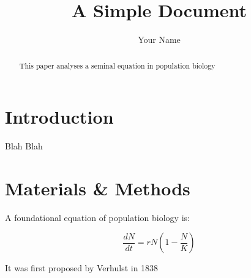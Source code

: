 \documentclass[12pt]{article}
\title{A Simple Document}
\author{Your Name}
\date{}
\begin{document}
	\maketitle
	
	\begin{abstract}
	This paper analyses a seminal equation in population biology
	\end{abstract}
	
	\section{Introduction}
	Blah Blah
	
	\section{Materials \& Methods}
	
	A foundational equation of population biology is:
	
	\begin{equation}
		\frac{dN}{dt}= r N (1 - \frac{N}{K})
	\end{equation}
	
	It was first proposed by Verhulst in 1838 \cite{verhulst1838notice}
	
	
	
\end{document}
